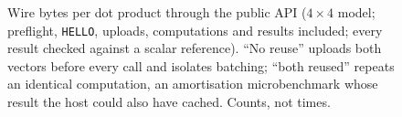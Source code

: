 \begin{figure}[t]
  \centering
  \resizebox{\columnwidth}{!}{}
  \caption{Wire bytes per dot product through the public API ($4\times4$
  model; preflight, \texttt{HELLO}, uploads, computations and results
  included; every result checked against a scalar reference). ``No reuse''
  uploads both vectors before every call and isolates batching; ``both
  reused'' repeats an identical computation, an amortisation microbenchmark
  whose result the host could also have cached. Counts, not times.}
  \label{fig:reuse}
\end{figure}
